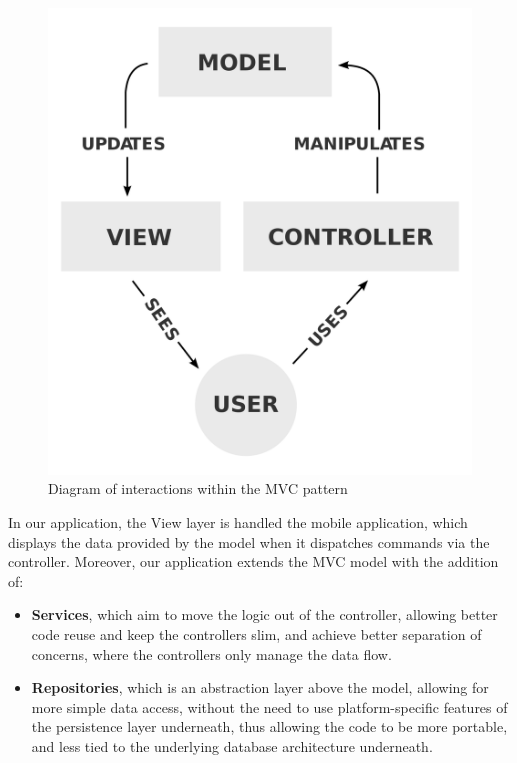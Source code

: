 \begin{figure}[!h]
	\centering
	\includegraphics[scale=0.15]{Picture/server/mvc.png}
	\caption{Diagram of interactions within the MVC pattern}
\label{fig:mvc}
\end{figure}

In our application, the View layer is handled the mobile application, which  displays the data provided by the model when it dispatches commands via the controller. Moreover, our application extends the MVC model with the addition of:
\begin{itemize}
\item \textbf{Services}, which aim to move the logic out of the controller, allowing better code reuse and keep the controllers slim, and achieve better separation of concerns, where the controllers only manage the data flow.
\item \textbf{Repositories}, which is an abstraction layer above the model, allowing for more simple data access, without the need to use platform-specific features of the persistence layer underneath, thus allowing the code to be more portable, and less tied to the underlying database architecture underneath.
\end{itemize}

